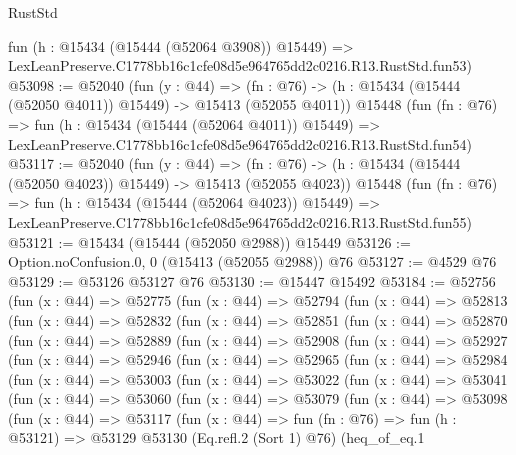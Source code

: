\begin{lexlean}{RustStd}
\begin{coremodule}
    fun (h : @15434 (@15444 (@52064 @3908)) @15449) =>
    LexLeanPreserve.C1778bb16c1cfe08d5e964765dd2c0216.R13.RustStd.fun53)
@53098 := @52040
    (fun (y : @44) =>
    (fn : @76) -> (h : @15434 (@15444 (@52050 @4011)) @15449) -> @15413 (@52055 @4011))
    @15448
    (fun (fn : @76) =>
    fun (h : @15434 (@15444 (@52064 @4011)) @15449) =>
    LexLeanPreserve.C1778bb16c1cfe08d5e964765dd2c0216.R13.RustStd.fun54)
@53117 := @52040
    (fun (y : @44) =>
    (fn : @76) -> (h : @15434 (@15444 (@52050 @4023)) @15449) -> @15413 (@52055 @4023))
    @15448
    (fun (fn : @76) =>
    fun (h : @15434 (@15444 (@52064 @4023)) @15449) =>
    LexLeanPreserve.C1778bb16c1cfe08d5e964765dd2c0216.R13.RustStd.fun55)
@53121 := @15434 (@15444 (@52050 @2988)) @15449
@53126 := Option.noConfusion.{0, 0} (@15413 (@52055 @2988)) @76
@53127 := @4529 @76
@53129 := @53126 @53127 @76
@53130 := @15447 @15492
@53184 := @52756
    (fun (x : @44) =>
    @52775
      (fun (x : @44) =>
      @52794
        (fun (x : @44) =>
        @52813
          (fun (x : @44) =>
          @52832
            (fun (x : @44) =>
            @52851
              (fun (x : @44) =>
              @52870
                (fun (x : @44) =>
                @52889
                  (fun (x : @44) =>
                  @52908
                    (fun (x : @44) =>
                    @52927
                      (fun (x : @44) =>
                      @52946
                        (fun (x : @44) =>
                        @52965
                          (fun (x : @44) =>
                          @52984
                            (fun (x : @44) =>
                            @53003
                              (fun (x : @44) =>
                              @53022
                                (fun (x : @44) =>
                                @53041
                                  (fun (x : @44) =>
                                  @53060
                                    (fun (x : @44) =>
                                    @53079
                                      (fun (x : @44) =>
                                      @53098
                                        (fun (x : @44) =>
                                        @53117
                                          (fun (x : @44) =>
                                          fun (fn : @76) =>
                                          fun (h : @53121) =>
                                          @53129
                                            @53130
                                            (Eq.refl.{2} (Sort 1) @76)
                                            (heq_of_eq.{1}

\end{coremodule}
\end{lexlean}
